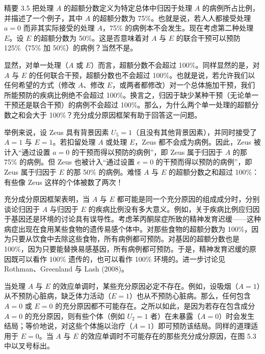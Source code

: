 \renewcommand{\FPname}{精要（Fine Point）}
\begin{finepoint}[关于归因分数的补充]
精要 3.5 把处理 $A$ 的超额分数定义为特定总体中归因于处理 $A$ 的病例所占比例，并描述了一个例子，其中 $A$ 的超额分数为 75\%。也就是说，若人人都接受处理 $a=0$ 而非其实际接受的处理 $A$，75\% 的病例本不会发生。现在考虑第二种处理 $E$。设 $E$ 的超额分数为 50\%。这是否意味着对 $A$ 与 $E$ 的联合干预可以预防 125\%（75\% 加 50\%）的病例？当然不是。

显然，对单一处理（$A$ 或 $E$）而言，超额分数不会超过 100\%。同样显然的是，对 $A$ 与 $E$ 的任何联合干预，超额分数也不会超过 100\%。也就是说，若允许我们以任何希望的方式（修改 $A$、修改 $E$，或两者都修改）对一个总体施加干预，我们所能预防的疾病比例绝不会超过 100\%。换言之，归因于缺少某种干预（无论单一干预还是联合干预）的病例不会超过 100\%。那么，为什么两个单一处理的超额分数之和会大于 100\%？充分成分原因框架有助于回答这一问题。

举例来说，设 Zeus 具有背景因素 $U_5=1$（且没有其他背景因素），并同时接受了 $A=1$ 与 $E=1$。若扣留处理 $A$ 或处理 $E$，Zeus 都不会成为病例。因此，Zeus 被计入“通过设置 $a=0$ 的干预而得以预防的病例”，即 Zeus 属于归因于 $A$ 的那 75\% 的病例。但 Zeus 也被计入“通过设置 $e=0$ 的干预而得以预防的病例”，即 Zeus 属于归因于 $E$ 的那 50\% 的病例。难怪 $A$ 与 $E$ 的超额分数之和超过 100\%：有些像 Zeus 这样的个体被数了两次！

充分成分原因框架表明，当 $A$ 与 $E$ 都可能是同一个充分原因的组成成分时，分别谈论归因于 $A$ 与归因于 $E$ 的疾病比例没有多大意义。例如，关于疾病比例应归因于基因还是环境的讨论具有误导性。考虑苯丙酮尿症所致的精神发育迟缓——这种病症出现在食用某些食物的遗传易感个体中。对那些食物的超额分数为 100\%，因为只要从饮食中去除这些食物，所有病例都可预防。对基因的超额分数也是 100\%，因为只要能替换易感基因，所有病例都可预防。于是，精神发育迟缓的原因既可以看作 100\% 遗传的，也可以看作 100\% 环境的。进一步讨论见 Rothman、Greenland 与 Lash (2008)。
\end{finepoint}
\renewcommand{\FPname}{精要}


\renewcommand{\TPname}{技术注记（Technical Point）}
\begin{techpoint}[因果效应的单调性与充分原因]
当处理 $A$ 与 $E$ 的效应单调时，某些充分原因必定不存在。例如，设吸烟（$A=1$）从不预防心脏病，缺乏体力活动（$E=1$）也从不预防心脏病。那么，任何包含 $A=0$ 或 $E=0$ 的充分原因都不可能存在。之所以如此，是因为若存在包含成分 $A=0$ 的充分原因，则有些个体（例如 $U_2=1$ 者）在未暴露（$A=0$）时会发生结局；等价地说，对这些个体施以治疗（$A=1$）即可预防该结局。同样的道理适用于 $E=0$。当 $A$ 与 $E$ 的效应单调时不可能存在的那些充分成分原因，在图 5.3 中以叉号标出。
\end{techpoint}
\renewcommand{\TPname}{技术注记}

